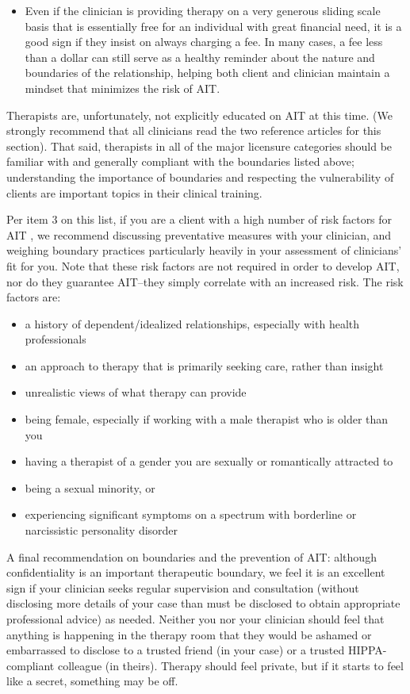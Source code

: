 \documentclass[12pt,letterpaper]{book}
\begin{document}
\begin{itemize}
    \item Even if the clinician is providing therapy on a very generous sliding scale basis that is essentially free for an individual with great financial need, it is a good sign if they insist on always charging a fee. In many cases, a fee less than a dollar can still serve as a healthy reminder about the nature and boundaries of the relationship, helping both client and clinician maintain a mindset that minimizes the risk of AIT.
\end{itemize}
Therapists are, unfortunately, not explicitly educated on AIT at this time. (We strongly recommend that all clinicians read the two reference articles for this section). That said, therapists in all of the major licensure categories should be familiar with and generally compliant with the boundaries listed above; understanding the importance of boundaries and respecting the vulnerability of clients are important topics in their clinical training.

Per item 3 on this list, if you are a client with a high number of risk factors for AIT \cite{transferranceLoveHarm,hook2018boundary}, we recommend discussing preventative measures with your clinician, and weighing boundary practices particularly heavily in your assessment of clinicians' fit for you. Note that these risk factors are not required in order to develop AIT, nor do they guarantee AIT–they simply correlate with an increased risk. The risk factors are:
\begin{itemize}
    \item a history of dependent/idealized relationships, especially with health professionals
    \item an approach to therapy that is primarily seeking care, rather than insight
    \item unrealistic views of what therapy can provide
    \item being female, especially if working with a male therapist who is older than you
    \item having a therapist of a gender you are sexually or romantically attracted to
    \item being a sexual minority, or
    \item experiencing significant symptoms on a spectrum with borderline or narcissistic personality disorder
\end{itemize}

A final recommendation on boundaries and the prevention of AIT: although confidentiality is an important therapeutic boundary, we feel it is an excellent sign if your clinician seeks regular supervision and consultation (without disclosing more details of your case than must be disclosed to obtain appropriate professional advice) as needed. Neither you nor your clinician should feel that anything is happening in the therapy room that they would be ashamed or embarrassed to disclose to a trusted friend (in your case) or a trusted HIPPA-compliant colleague (in theirs). Therapy should feel private, but if it starts to feel like a secret, something may be off.
\end{document}
